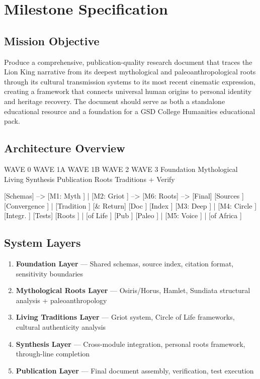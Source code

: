 \documentclass[11pt,letterpaper]{article}
\begin{document}
\section{Milestone Specification}

\subsection{Mission Objective}

Produce a comprehensive, publication-quality research document that traces the Lion King narrative from its deepest mythological and paleoanthropological roots through its cultural transmission systems to its most recent cinematic expression, creating a framework that connects universal human origins to personal identity and heritage recovery. The document should serve as both a standalone educational resource and a foundation for a GSD College Humanities educational pack.

\subsection{Architecture Overview}

\begin{asciibox}
  WAVE 0         WAVE 1A          WAVE 1B         WAVE 2        WAVE 3
  Foundation     Mythological     Living           Synthesis     Publication
                 Roots            Traditions                     + Verify
  
  [Schemas]  --> [M1: Myth    ] | [M2: Griot   ] --> [M6: Roots] --> [Final]
  [Sources ]     [Convergence ] | [Tradition   ]     [& Return]     [Doc  ]
  [Index   ]     [M3: Deep    ] | [M4: Circle  ]     [Integr. ]     [Tests]
                 [Roots       ] | [of Life     ]                    [Pub  ]
                 [Paleo       ] | [M5: Voice   ]
                                | [of Africa   ]
\end{asciibox}

\subsection{System Layers}

\begin{enumerate}[leftmargin=2em]
  \item \textbf{Foundation Layer} --- Shared schemas, source index, citation format, sensitivity boundaries
  \item \textbf{Mythological Roots Layer} --- Osiris/Horus, Hamlet, Sundiata structural analysis + paleoanthropology
  \item \textbf{Living Traditions Layer} --- Griot system, Circle of Life frameworks, cultural authenticity analysis
  \item \textbf{Synthesis Layer} --- Cross-module integration, personal roots framework, through-line completion
  \item \textbf{Publication Layer} --- Final document assembly, verification, test execution
\end{enumerate}
\end{document}
